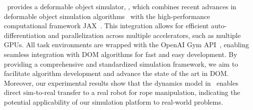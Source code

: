 \algo\ provides a deformable object simulator, \simulator, which combines recent advances in deformable object simulation algorithms~\citep{SHAC, ILD} with the high-performance computational framework JAX~\citep{jax2018github}. This integration allows for efficient auto-differentiation and parallelization across multiple accelerators, such as multiple GPUs. All task environments are wrapped with the OpenAI Gym API~\citep{OpenAIGym}, enabling seamless integration with DOM algorithms for fast and easy development. By providing a comprehensive and standardized simulation framework, we aim to facilitate algorithm development and advance the state of the art in DOM. Moreover, our experimental results show that the dynamics model  in \algo\ enables direct sim-to-real transfer to a real robot for rope manipulation, indicating the potential applicability of our simulation platform to real-world problems.
